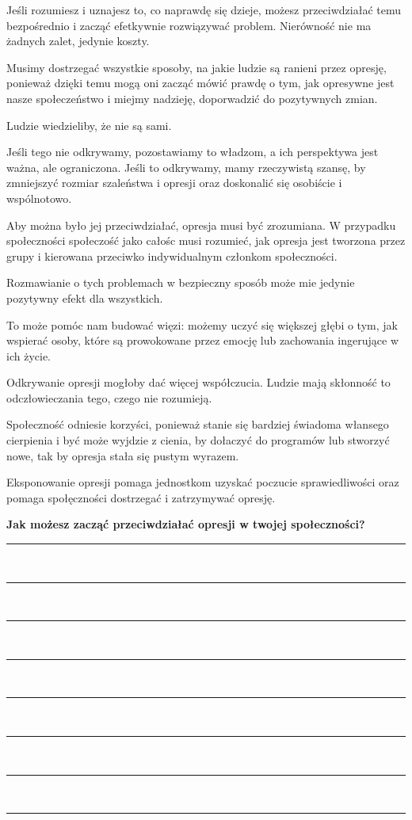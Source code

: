 \begin{checkboxlist}
	\item Jeśli rozumiesz i uznajesz to, co naprawdę się dzieje, możesz przeciwdziałać temu bezpośrednio i zacząć efetkywnie rozwiązywać problem. Nierówność nie ma żadnych zalet, jedynie koszty.
	\item Musimy dostrzegać wszystkie sposoby, na jakie ludzie są ranieni przez opresję, ponieważ dzięki temu mogą oni zacząć mówić prawdę o tym, jak opresywne jest nasze społeczeństwo i miejmy nadzieję, doporwadzić do pozytywnych zmian.
	\item Ludzie wiedzieliby, że nie są sami.
	\item Jeśli tego nie odkrywamy, pozostawiamy to władzom, a ich perspektywa jest ważna, ale ograniczona. Jeśli to odkrywamy, mamy rzeczywistą szansę, by zmniejszyć rozmiar szaleństwa i opresji oraz doskonalić się osobiście i wspólnotowo.
	\item Aby można było jej przeciwdziałać, opresja musi być zrozumiana. W przypadku społeczności społeczość jako całośc musi rozumieć, jak opresja jest tworzona przez grupy i kierowana przeciwko indywidualnym członkom społeczności.
	\item Rozmawianie o tych problemach w bezpieczny sposób może mie jedynie pozytywny efekt dla wszystkich.
	\item To może pomóc nam budować więzi: możemy uczyć się większej głębi o tym, jak wspierać osoby, które są prowokowane przez emocję lub zachowania ingerujące w ich życie.
	\item Odkrywanie opresji mogłoby dać więcej współczucia. Ludzie mają skłonność to odczłowieczania tego, czego nie rozumieją.
	\item Społeczność odniesie korzyści, ponieważ stanie się bardziej świadoma włansego cierpienia i być może wyjdzie z cienia, by dołaczyć do programów lub stworzyć nowe, tak by opresja stała się pustym wyrazem.
	\item Eksponowanie opresji pomaga jednostkom uzyskać poczucie sprawiedliwości oraz pomaga społęczności dostrzegać i zatrzymywać opresję.
\end{checkboxlist}

\noindent\textcolor{ProcessBlue}{\textbf{\LARGE{Jak możesz zacząć przeciwdziałać opresji w twojej społeczności?}}}\\

\noindent\rule{\textwidth}{1pt}\\
\noindent\rule{\textwidth}{1pt}\\
\noindent\rule{\textwidth}{1pt}\\
\noindent\rule{\textwidth}{1pt}\\
\noindent\rule{\textwidth}{1pt}\\
\noindent\rule{\textwidth}{1pt}\\
\noindent\rule{\textwidth}{1pt}\\
\noindent\rule{\textwidth}{1pt}\\\\



